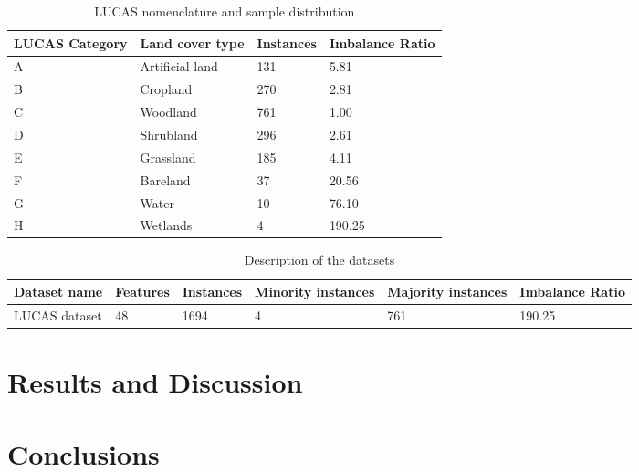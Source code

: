 \documentclass[parskip=full]{scrartcl}
\begin{document}
\begin{table}[H]
	\centering
	\begin{tabular}{|p{2.2cm}|p{2.3cm}|p{2cm}|p{2cm}|}
		\hline
		\textbf{LUCAS Category} & \textbf{Land cover type} & \textbf{Instances}
		& \textbf{Imbalance Ratio} \\
		\hline
		A & Artificial land& 131 & 5.81 \\
		\hline
		B & Cropland & 270 & 2.81 \\
		\hline
		C & Woodland & 761 & 1.00 \\
		\hline
		D & Shrubland & 296 & 2.61 \\
		\hline
		E & Grassland & 185 & 4.11 \\
		\hline
		F & Bareland & 37 & 20.56 \\
		\hline
		G & Water & 10 & 76.10 \\
		\hline
		H & Wetlands & 4 &  190.25\\
		\hline
	\end{tabular}
	\caption{\label{tab:datasets}LUCAS nomenclature and sample distribution}
\end{table}

\begin{table}[H]
	\centering
	\begin{tabular}{|p{2.7cm}|p{3cm}|p{2cm}|p{2cm}|p{2cm}|p{2cm}|}
		\hline
		\textbf{Dataset name} & \textbf{Features} & \textbf{Instances} &
		\textbf{Minority instances} & \textbf{Majority instances}	&
		\textbf{Imbalance Ratio} \\
		\hline
		LUCAS dataset & 48 & 1694 & 4 & 761 & 190.25 \\
		\hline
	\end{tabular}
	\caption{\label{tab:datasets}Description of the datasets}
\end{table}

\section{Results and Discussion}

\section{Conclusions}





\end{document}
